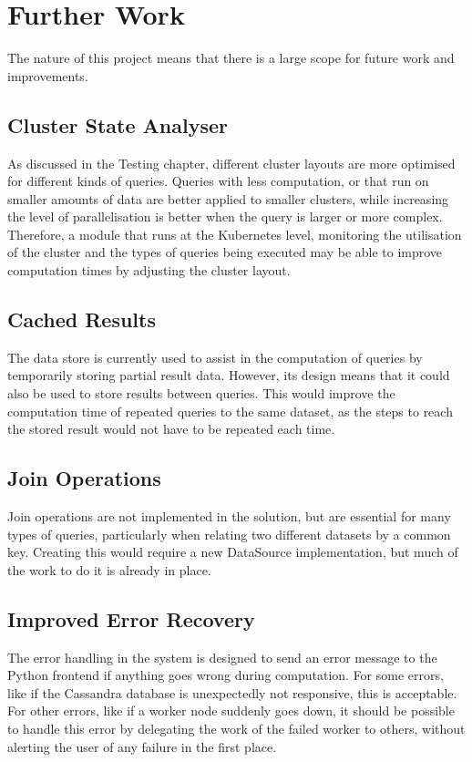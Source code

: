 \section{Further Work}
The nature of this project means that there is a large scope for future work and improvements.

\subsection{Cluster State Analyser}
As discussed in the Testing chapter, different cluster layouts are more optimised for different kinds of queries. Queries with less computation, or that run on smaller amounts of data are better applied to smaller clusters, while increasing the level of parallelisation is better when the query is larger or more complex. Therefore, a module that runs at the Kubernetes level, monitoring the utilisation of the cluster and the types of queries being executed may be able to improve computation times by adjusting the cluster layout.

\subsection{Cached Results}
The data store is currently used to assist in the computation of queries by temporarily storing partial result data. However, its design means that it could also be used to store results between queries. This would improve the computation time of repeated queries to the same dataset, as the steps to reach the stored result would not have to be repeated each time.

\subsection{Join Operations}
Join operations are not implemented in the solution, but are essential for many types of queries, particularly when relating two different datasets by a common key. Creating  this would require a new DataSource implementation, but much of the work to do it is already in place.

\subsection{Improved Error Recovery}
The error handling in the system is designed to send an error message to the Python frontend if anything goes wrong during computation. For some errors, like if the Cassandra database is unexpectedly not responsive, this is acceptable. For other errors, like if a worker node suddenly goes down, it should be possible to handle this error by delegating the work of the failed worker to others, without alerting the user of any failure in the first place.

